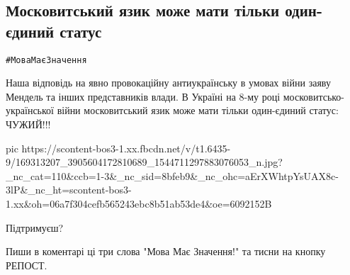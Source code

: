  
 
 
 
 

\subsection{Московитський язик може мати тільки один-єдиний статус}
\label{sec:05_04_2021.fb.smolij_andrij.1.jazyk}

\verb|#МоваМаєЗначення|

Наша відповідь на явно провокаційну антиукраїнську в умовах війни заяву Мендель
та інших представників влади.  В Україні на 8-му році московитсько-української
війни московитський язик може мати тільки один-єдиний статус: ЧУЖИЙ!!!

\ifcmt
  pic https://scontent-bos3-1.xx.fbcdn.net/v/t1.6435-9/169313207_3905604172810689_1544711297883076053_n.jpg?_nc_cat=110&ccb=1-3&_nc_sid=8bfeb9&_nc_ohc=aErXWhtpYsUAX8c-3lP&_nc_ht=scontent-bos3-1.xx&oh=06a7f304cefb565243ebc8b51ab53de4&oe=6092152B
\fi

Підтримуєш?

Пиши в коментарі ці три слова "Мова Має Значення!" та тисни на кнопку РЕПОСТ.
